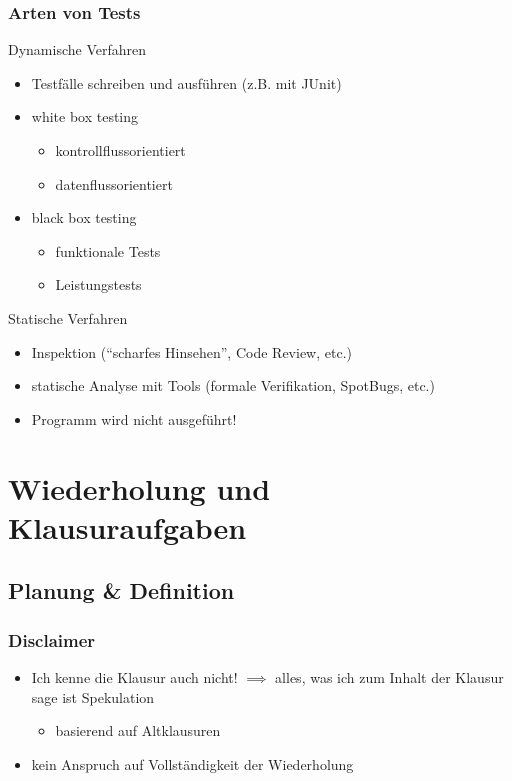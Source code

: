 \documentclass[18pt]{beamer}
\begin{document}
	\begin{frame}
		\frametitle{Arten von Tests}
		\begin{block}{Dynamische Verfahren}
			\begin{itemize}
				\item Testfälle schreiben und ausführen (z.B. mit JUnit) \pause
				\item white box testing \pause
				\begin{itemize}
					\item kontrollflussorientiert
					\item datenflussorientiert
				\end{itemize}
				\item black box testing \pause
				\begin{itemize}
					\item funktionale Tests \pause
					\item Leistungstests
				\end{itemize}
			\end{itemize}
		\end{block}
		\pause
		\begin{block}{Statische Verfahren}
			\begin{itemize}
				\item Inspektion (\enquote{scharfes Hinsehen}, Code Review, etc.)\pause
				\item statische Analyse mit Tools (formale Verifikation, SpotBugs, etc.)\pause
				\item Programm wird nicht ausgeführt!
			\end{itemize}
		\end{block}
	\end{frame}

\section{Wiederholung und Klausuraufgaben}

	\subsection{Planung \& Definition}
	\begin{frame}
		\frametitle{Disclaimer}
		\begin{large}
			\begin{itemize}
				\item Ich kenne die Klausur auch nicht! \pause
				\linebreak $\implies$ alles, was ich zum Inhalt der Klausur sage ist Spekulation
				\begin{itemize}
					\item basierend auf Altklausuren \pause
				\end{itemize}
				\item kein Anspruch auf Vollständigkeit der Wiederholung
			\end{itemize}
		\end{large}
	\end{frame}
\end{document}
